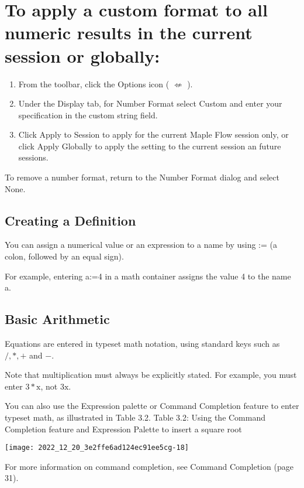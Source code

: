 \section{To apply a custom format to all numeric results in the current session or globally:}
\begin{enumerate}
  \item From the toolbar, click the Options icon ( $\nLeftarrow$ ).

  \item Under the Display tab, for Number Format select Custom and enter your specification in the custom string field.

  \item Click Apply to Session to apply for the current Maple Flow session only, or click Apply Globally to apply the setting to the current session an future sessions.

\end{enumerate}

To remove a number format, return to the Number Format dialog and select None.

\subsection{Creating a Definition}
You can assign a numerical value or an expression to a name by using := (a colon, followed by an equal sign).

For example, entering a:=4 in a math container assigns the value 4 to the name a.

\subsection{Basic Arithmetic}
Equations are entered in typeset math notation, using standard keys such as $/, *,+$ and $-$.

Note that multiplication must always be explicitly stated. For example, you must enter $3 * \mathrm{x}$, not $3 \mathrm{x}$.

You can also use the Expression palette or Command Completion feature to enter typeset math, as illustrated in Table 3.2. Table 3.2: Using the Command Completion feature and Expression Palette to insert a square root

\begin{center}
\texttt{[image: 2022\_12\_20\_3e2ffe6ad124ec91ee5cg-18]}
\end{center}

For more information on command completion, see Command Completion (page 31).

